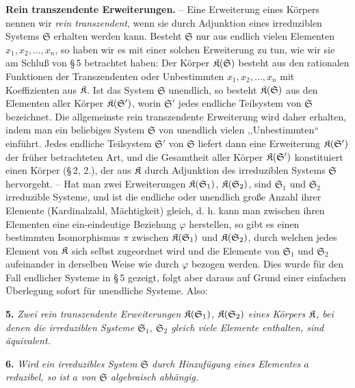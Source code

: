 \textbf{Rein transzendente Erweiterungen.} -- Eine Erweiterung eines Körpers nennen wir \emph{rein transzendent}, wenn sie durch Adjunktion eines irreduziblen Systems $\mathfrak S$ erhalten werden kann. Besteht $\mathfrak S$ nur aus endlich vielen Elementen $x_1,x_2,\ldots,x_n$, so haben wir es mit einer solchen Erweiterung zu tun, wie wir sie am Schluß von \S\,5 betrachtet haben: Der Körper $\mathfrak K(\mathfrak S)$ besteht aus den rationalen Funktionen der Transzendenten oder Unbestimmten $x_1,x_2,\ldots,x_n$ mit Koeffizienten aus $\mathfrak K$. Ist das System $\mathfrak S$ unendlich, so besteht $\mathfrak K(\mathfrak S)$ aus den Elementen aller Körper $\mathfrak K(\mathfrak S')$, worin $\mathfrak S'$ jedes endliche Teilsystem von $\mathfrak S$ bezeichnet. Die allgemeinste rein transzendente Erweiterung wird daher erhalten, indem man ein beliebiges System $\mathfrak S$ von unendlich vielen ,,Unbestimmten`` einführt. Jedes endliche Teilsystem $\mathfrak S'$ von $\mathfrak S$ liefert dann eine Erweiterung $\mathfrak K(\mathfrak S')$ der früher betrachteten Art, und die Gesamtheit aller Körper $\mathfrak K(\mathfrak S')$ konstituiert einen Körper (\S\,2, 2.), der aus $\mathfrak K$ durch Adjunktion des irreduziblen Systems $\mathfrak S$ hervorgeht. -- Hat man zwei Erweiterungen $\mathfrak K(\mathfrak S_1)$, $\mathfrak K(\mathfrak S_2)$, sind $\mathfrak S_1$ und $\mathfrak S_2$ irreduzible Systeme, und ist die endliche oder unendlich große Anzahl ihrer Elemente (Kardinalzahl, Mächtigkeit) gleich, d. h. kann man zwischen ihren Elementen eine ein-eindeutige Beziehung $\varphi$ herstellen, so gibt es einen bestimmten Isomorphismus $\pi$ zwischen $\mathfrak K(\mathfrak S_1)$ und $\mathfrak K(\mathfrak S_2)$, durch welchen jedes Element von $\mathfrak K$ sich selbst zugeordnet wird und die Elemente von $\mathfrak S_1$ und $\mathfrak S_2$ aufeinander in derselben Weise wie durch $\varphi$ bezogen werden. Dies wurde für den Fall endlicher Systeme in \S\,5 gezeigt, folgt aber daraus auf Grund einer einfachen Überlegung sofort für unendliche Systeme. Also:

\textbf{5.} \emph{Zwei rein transzendente Erweiterungen $\mathfrak K(\mathfrak S_1)$, $\mathfrak K(\mathfrak S_2)$ eines Körpers $\mathfrak K$, bei denen die irreduziblen Systeme $\mathfrak S_1$, $\mathfrak S_2$ gleich viele Elemente enthalten, sind äquivalent.}

\textbf{6.} \emph{Wird ein irreduzibles System $\mathfrak S$ durch Hinzufügung eines Elementes $a$ reduzibel, so ist $a$ von $\mathfrak S$ algebraisch abhängig.}

